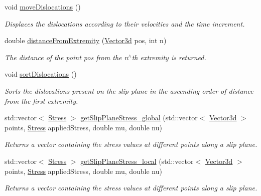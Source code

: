 \begin{DoxyCompactItemize}
void \hyperlink{classSlipPlane_a02482abbb9b9db28a9bb19e6a1c181b5}{move\-Dislocations} ()
\begin{DoxyCompactList}\small\item\em Displaces the dislocations according to their velocities and the time increment. \end{DoxyCompactList}\item 
double \hyperlink{classSlipPlane_a3523030cccb520b5253a811d062f3ddf}{distance\-From\-Extremity} (\hyperlink{classVector3d}{Vector3d} pos, int n)
\begin{DoxyCompactList}\small\item\em The distance of the point pos from the n$^\wedge$th extremity is returned. \end{DoxyCompactList}\item 
void \hyperlink{classSlipPlane_a7fc607c17e5532aed5e93339dc03b18d}{sort\-Dislocations} ()
\begin{DoxyCompactList}\small\item\em Sorts the dislocations present on the slip plane in the ascending order of distance from the first extremity. \end{DoxyCompactList}\item 
std\-::vector$<$ \hyperlink{classStress}{Stress} $>$ \hyperlink{classSlipPlane_a1cc47e2092a588ff04fd14e9ce9e5906}{get\-Slip\-Plane\-Stress\-\_\-global} (std\-::vector$<$ \hyperlink{classVector3d}{Vector3d} $>$ points, \hyperlink{classStress}{Stress} applied\-Stress, double mu, double nu)
\begin{DoxyCompactList}\small\item\em Returns a vector containing the stress values at different points along a slip plane. \end{DoxyCompactList}\item 
std\-::vector$<$ \hyperlink{classStress}{Stress} $>$ \hyperlink{classSlipPlane_ad86337ca356d72f558468a35024e30bc}{get\-Slip\-Plane\-Stress\-\_\-local} (std\-::vector$<$ \hyperlink{classVector3d}{Vector3d} $>$ points, \hyperlink{classStress}{Stress} applied\-Stress, double mu, double nu)
\begin{DoxyCompactList}\small\item\em Returns a vector containing the stress values at different points along a slip plane. \end{DoxyCompactList}\end{DoxyCompactItemize}

